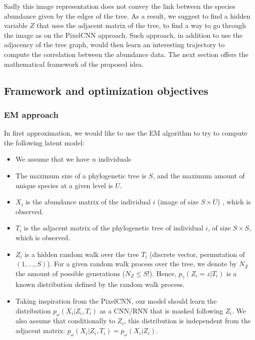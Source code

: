 Sadly this image representation does not convey the link between the species abundance given by the edges of the tree.
As a result, we suggest to find a hidden variable $Z$ that uses the adjacent matrix of the tree, to find a way to go through the image
as on the PixelCNN approach.
Such approach, in addition to use the adjacency of the tree graph, would then learn an interesting trajectory to compute the correlation between the abundance data.
The next section offers the mathematical framework of the proposed idea.

\subsection{Framework and optimization objectives}

\subsubsection{EM approach}

In first approximation, we would like to use the EM algorithm to try to compute the following latent model:
\begin{itemize}
    \item We assume that we have $n$ individuals
    \item The maximum size of a phylogenetic tree is $S$, and the maximum amount of unique species at a given level is $U$.
    \item $X_i$ is the abundance matrix of the individual $i$ (image of size $S \times U$) , which is observed.
    \item $T_i$ is the adjacent matrix of the phylogenetic tree of individual $i$, of size $S \times S$, which is observed.
    \item $Z_i$ is a hidden random walk over the tree $T_i$ (discrete vector, permutation of $(1, \dots, S)$).
          For a given random walk process over the tree, we denote by $N_{Z}$ the amount of possible generations ($N_Z \leq S!$).
          Hence, $p_{\gamma}(Z_i = z | T_i)$ is a known distribution defined by the random walk process.
    \item Taking inspiration from the PixelCNN, our model should learn the distribution $p_{\omega}(X_i | Z_i, T_i)$ as a CNN/RNN that is masked following $Z_i$.
          We also assume that conditionally to $Z_i$, this distribution is independent from the adjacent matrix: $p_{\omega}(X_i | Z_i, T_i) = p_{\omega}(X_i | Z_i)$.
\end{itemize}

